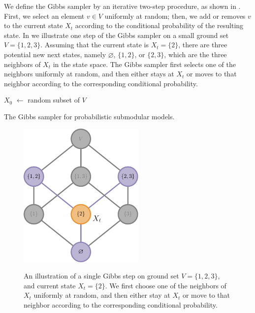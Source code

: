 We define the Gibbs sampler by an iterative two-step procedure, as shown in .
First, we select an element $v \in V$ uniformly at random; then, we add or removes $v$ to the current state $X_t$ according to the conditional probability of the resulting state.
In  we illustrate one step of the Gibbs sampler on a small ground set $V = \{1, 2, 3\}$.
Assuming that the current state is $X_t = \{2\}$, there are three potential new next states, namely $\varnothing$, $\{1, 2\}$, or $\{2, 3\}$, which are the three neighbors of $X_t$ in the state space.
The Gibbs sampler first selects one of the neighbors uniformly at random, and then either stays at $X_t$ or moves to that neighbor according to the corresponding conditional probability.

\begin{algorithm}[tb]
    \DontPrintSemicolon
    \vspace{0.5em}
	$X_0$ $\gets$ random subset of $V$\\
	\caption{The Gibbs sampler for probabilistic submodular models.}
	\label{alg:gibbs}
\end{algorithm}

\begin{figure}[htb]
\centering
\includegraphics[width=0.55\textwidth]{figures/gibbs/lattice_gibbs_2.pdf}\\[1em]
\caption{An illustration of a single Gibbs step on ground set $V = \{1, 2, 3\}$, and current state $X_t = \{2\}$.
We first choose one of the neighbors of $X_t$ uniformly at random, and then either stay at $X_t$ or move to that neighbor according to the corresponding conditional probability.}
\label{fig:gibbs}
\end{figure}

